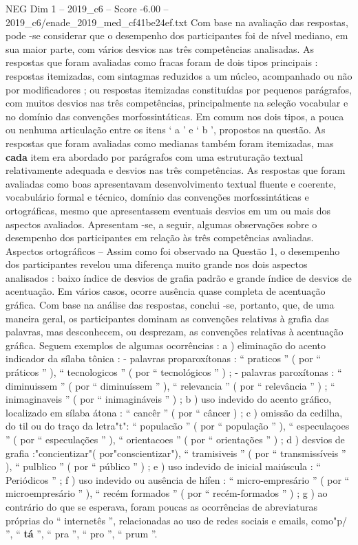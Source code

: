 \begin{textsample}{NEG Dim 1 – 2019\_c6 – Score -6.00 – 2019\_c6/enade\_2019\_med\_cf41be24ef.txt}
Com base na avaliação das respostas, pode -se considerar que o desempenho dos participantes foi de nível mediano, em sua maior parte, com vários desvios nas três competências analisadas.
As respostas que foram avaliadas como fracas foram de dois tipos principais : respostas itemizadas, com sintagmas reduzidos a um núcleo, acompanhado ou não por modificadores ; ou respostas itemizadas constituídas por pequenos parágrafos, com muitos desvios nas três competências, principalmente na seleção vocabular e no domínio das convenções morfossintáticas.
Em comum nos dois tipos, a pouca ou nenhuma articulação entre os itens ‘ a ’ e ‘ b ’, propostos na questão.
As respostas que foram avaliadas como medianas também foram itemizadas, mas \textbf{cada} item era abordado por parágrafos com uma estruturação textual relativamente adequada e desvios nas três competências.
As respostas que foram avaliadas como boas apresentavam desenvolvimento textual fluente e coerente, vocabulário formal e técnico, domínio das convenções morfossintáticas e ortográficas, mesmo que apresentassem eventuais desvios em um ou mais dos aspectos avaliados.
Apresentam -se, a seguir, algumas observações sobre o desempenho dos participantes em relação às três competências avaliadas.
Aspectos ortográficos – Assim como foi observado na Questão 1, o desempenho dos participantes revelou uma diferença muito grande nos dois aspectos analisados : baixo índice de desvios de grafia padrão e grande índice de desvios de acentuação.
Em vários casos, ocorre ausência quase completa de acentuação gráfica.
Com base na análise das respostas, conclui -se, portanto, que, de uma maneira geral, os participantes dominam as convenções relativas à grafia das palavras, mas desconhecem, ou desprezam, as convenções relativas à acentuação gráfica.
Seguem exemplos de algumas ocorrências : a ) eliminação do acento indicador da sílaba tônica : - palavras proparoxítonas : “ praticos ” ( por “ práticos ” ), “ tecnologicos ” ( por “ tecnológicos ” ) ; - palavras paroxítonas : “ diminuissem ” ( por “ diminuíssem ” ), “ relevancia ” ( por “ relevância ” ) ; “ inimaginaveis ” ( por “ inimagináveis ” ) ; b ) uso indevido do acento gráfico, localizado em sílaba átona : “ cancêr ” ( por “ câncer ) ; c ) omissão da cedilha, do til ou do traço da letra"t": “ populacão ” ( por “ população ” ), “ especulaçoes ” ( por “ especulações ” ), “ orientacoes ” ( por “ orientações ” ) ; d ) desvios de grafia :"concientizar"( por"conscientizar"), “ tramisiveis ” ( por “ transmissíveis ” ), “ pulblico ” ( por “ público ” ) ; e ) uso indevido de inicial maiúscula : “ Periódicos ” ; f ) uso indevido ou ausência de hífen : “ micro-empresário ” ( por “ microempresário ” ), “ recém formados ” ( por “ recém-formados ” ) ; g ) ao contrário do que se esperava, foram poucas as ocorrências de abreviaturas próprias do “ internetês ”, relacionadas ao uso de redes sociais e emails, como"p/ ”, “ \textbf{tá} ”, “ pra ”, “ pro ”, “ prum ”.

\end{textsample}
